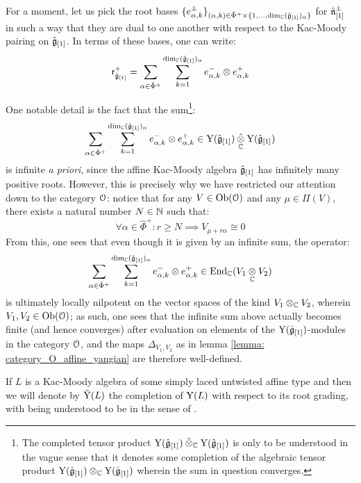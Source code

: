         \begin{remark}
            For a moment, let us pick the root bases $\{ e_{\alpha, k}^{\pm} \}_{(\alpha, k) \in \hat{\Phi}^+ \x \{1, ..., \dim_{\bbC} (\hat{\g}_{[1]})_{\alpha} \}}$ for $\hat{\mathfrak{n}}_{[1]}^{\pm}$ in such a way that they are dual to one another with respect to the Kac-Moody pairing on $\hat{\mathfrak{g}}_{[1]}$. In terms of these bases, one can write:
                $$\sfr_{\hat{\g}_{[1]}}^+ = \sum_{\alpha \in \hat{\Phi}^+} \sum_{k = 1}^{ \dim_{\bbC} (\hat{\g}_{[1]})_{\alpha} } e_{\alpha, k}^- \tensor e_{\alpha, k}^+$$
        
            One notable detail is the fact that the sum\footnote{The completed tensor product $\rmY(\hat{\g}_{[1]}) \hattensor_{\bbC} \rmY(\hat{\g}_{[1]})$ is only to be understood in the vague sense that it denotes some completion of the algebraic tensor product $\rmY(\hat{\g}_{[1]}) \tensor_{\bbC} \rmY(\hat{\g}_{[1]})$ wherein the sum in question converges.}:
                $$\sum_{\alpha \in \hat{\Phi}^+} \sum_{k = 1}^{ \dim_{\bbC} (\hat{\g}_{[1]})_{\alpha} } e_{\alpha, k}^- \tensor e_{\alpha, k}^+ \in \rmY(\hat{\g}_{[1]}) \hattensor_{\bbC} \rmY(\hat{\g}_{[1]})$$
            is infinite \textit{a priori}, since the affine Kac-Moody algebra $\hat{\mathfrak{g}}_{[1]}$ has infinitely many positive roots. However, this is precisely why we have restricted our attention down to the category $\mathcal{O}$: notice that for any $V \in \mathrm{Ob}(\mathcal{O})$ and any $\mu \in \Pi(V)$, there exists a natural number $N \in \mathbb{N}$ such that:
                $$\forall \alpha \in \hat{\Phi}^+: r \geq N \implies V_{\mu + r \alpha} \cong 0$$
            From this, one sees that even though it is given by an infinite sum, the operator:
                $$\sum_{\alpha \in \hat{\Phi}^+} \sum_{k = 1}^{ \dim_{\bbC} (\hat{\g}_{[1]})_{\alpha} } e_{\alpha, k}^- \tensor e_{\alpha, k}^+ \in \End_{\bbC}(V_1 \tensor_{\bbC} V_2)$$
            is ultimately locally nilpotent on the vector spaces of the kind $V_1 \tensor_{\bbC} V_2$, wherein $V_1, V_2 \in \mathrm{Ob}(\mathcal{O})$; as such, one sees that the infinite sum above actually becomes finite (and hence converges) after evaluation on elements of the $\mathrm{Y}(\hat{\mathfrak{g}}_{[1]})$-modules in the category $\mathcal{O}$, and the maps $\Delta_{V_1, V_2}$ as in lemma \ref{lemma: category_O_affine_yangian} are therefore well-defined. 
        \end{remark}
        \begin{convention}
            If $L$ is a Kac-Moody algebra of some simply laced untwisted affine type and then we will denote by $\breve{\mathrm{Y}}(L)$ the completion of $\mathrm{Y}(L)$ with respect to its root grading, with  being understood to be in the sense of \cite[Appendix A]{wendlandt_formal_shift_operators_on_yangian_doubles}.
        \end{convention}
